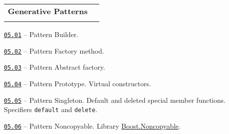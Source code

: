 \documentclass[a4paper,12pt]{article}
\renewenvironment{itemize}
{
    \begin{list}{\labelitemi}
    {
      \setlength{\topsep}{0pt}
      \setlength{\partopsep}{0pt}
      \setlength{\parskip}{0pt}
      \setlength{\itemsep}{0pt}
      \setlength{\parsep}{0pt}
      \setlength{\leftmargin}{14.5pt}
    }
}{\end{list}}
\begin{document}
\begin{tabular}{!{\vrule width 1pt}L{3.9cm}!{\vrule width 1pt}L{15.1cm}!{\vrule width 0pt}} 


\textbf{Generative Patterns} & \\


\end{tabular}

\medskip\smallskip

\begin{itemize}

    \item \href{https://github.com/i-s-m-mipt/Education/blob/master/projects/examples/source/05.01.cpp}{\texttt{05.01}} -- Pattern Builder. 

    \smallskip

    \item \href{https://github.com/i-s-m-mipt/Education/blob/master/projects/examples/source/05.02.cpp}{\texttt{05.02}} -- Pattern Factory method.

    \smallskip

    \item \href{https://github.com/i-s-m-mipt/Education/blob/master/projects/examples/source/05.03.cpp}{\texttt{05.03}} -- Pattern Abstract factory. 

    \smallskip

    \item \href{https://github.com/i-s-m-mipt/Education/blob/master/projects/examples/source/05.04.cpp}{\texttt{05.04}} -- Pattern Prototype. Virtual constructors.

    \smallskip

    \item \href{https://github.com/i-s-m-mipt/Education/blob/master/projects/examples/source/05.05.cpp}{\texttt{05.05}} -- Pattern Singleton. Default and deleted special member functions. Specifiers \lstinline{default} and \lstinline{delete}.

    \smallskip

    \item \href{https://github.com/i-s-m-mipt/Education/blob/master/projects/examples/source/05.06.cpp}{\texttt{05.06}} -- Pattern Noncopyable. Library \href{https://www.boost.org/doc/libs/1_85_0/libs/core/doc/html/index.html}{Boost.Noncopyable}.

\end{itemize}
\end{document}
